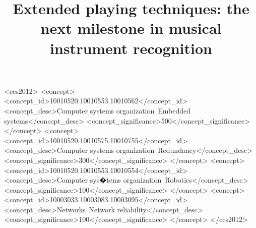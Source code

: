 \documentclass[sigconf]{acmart}
\begin{document}
%
%
\begin{CCSXML}
<ccs2012>
 <concept>
  <concept_id>10010520.10010553.10010562</concept_id>
  <concept_desc>Computer systems organization~Embedded systems</concept_desc>
  <concept_significance>500</concept_significance>
 </concept>
 <concept>
  <concept_id>10010520.10010575.10010755</concept_id>
  <concept_desc>Computer systems organization~Redundancy</concept_desc>
  <concept_significance>300</concept_significance>
 </concept>
 <concept>
  <concept_id>10010520.10010553.10010554</concept_id>
  <concept_desc>Computer sys�tems organization~Robotics</concept_desc>
  <concept_significance>100</concept_significance>
 </concept>
 <concept>
  <concept_id>10003033.10003083.10003095</concept_id>
  <concept_desc>Networks~Network reliability</concept_desc>
  <concept_significance>100</concept_significance>
 </concept>
</ccs2012>
\end{CCSXML}





\maketitle

\title{Extended playing techniques: the next milestone in musical instrument recognition}



\clearpage



\end{document}
